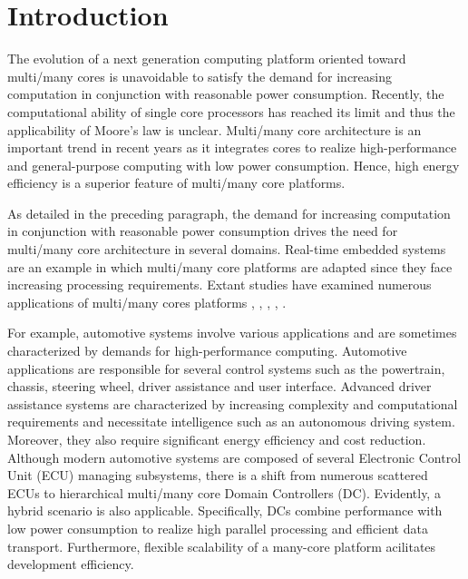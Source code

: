 \documentclass{sig-alternate-05-2015}
\begin{document}


\section{Introduction}
The evolution of a next generation computing platform oriented toward multi/many cores is unavoidable to satisfy the demand for increasing computation in conjunction with reasonable power consumption.
Recently, the computational ability of single core processors has reached its limit and thus the applicability of Moore's law \cite{moore2006cramming} is unclear.
Multi/many core architecture is an important trend in recent years as it integrates cores to realize high-performance and general-purpose computing with low power consumption.
Hence, high energy efficiency is a superior feature of multi/many core platforms.

 As detailed in the preceding paragraph, the demand for increasing computation in conjunction with reasonable power consumption drives the need for multi/many core architecture in several domains.
Real-time embedded systems are an example in which multi/many core platforms are adapted since they face increasing processing requirements.
Extant studies have examined numerous applications of multi/many cores platforms \cite{becker2016contention}, \cite{saidi2015shift}, \cite{perret2016temporal}, \cite{perret2016mapping}, \cite{becker2014mapping}.

For example, automotive systems involve various applications and are sometimes characterized by demands for high-performance computing.
Automotive applications are responsible for several control systems such as the powertrain, chassis, steering wheel, driver assistance and user interface.
Advanced driver assistance systems are
characterized by increasing complexity and computational requirements and necessitate intelligence such as an autonomous driving system.
Moreover, they also require significant energy efficiency and cost reduction.
Although modern automotive systems are composed of several Electronic Control Unit (ECU) managing subsystems,
there is a shift from numerous scattered ECUs to hierarchical multi/many core Domain Controllers (DC).
Evidently, a hybrid scenario is also applicable. 
Specifically, DCs combine performance with low power consumption to realize high parallel processing and efficient data transport.
Furthermore, flexible scalability of a many-core platform acilitates development efficiency.
\end{document}

